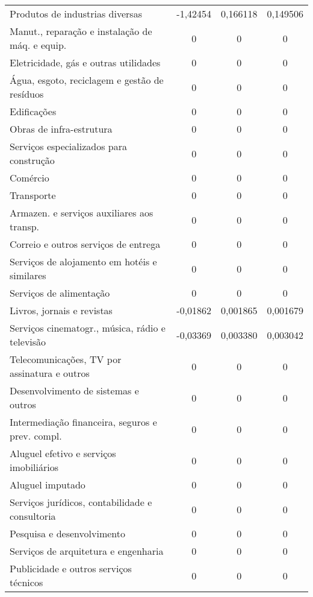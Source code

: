 \begin{apendicesenv}
\begin{small}
\begin{center}
\begin{longtable}{m{8cm}ccc}
				Produtos de industrias diversas                    & -1,42454 & 0,166118 & 0,149506 \\
				Manut., reparação e instalação de máq. e equip.    & 0 & 0 & 0 \\
				Eletricidade, gás e outras   utilidades            & 0 & 0 & 0 \\
				Água, esgoto, reciclagem e   gestão de resíduos    & 0 & 0 & 0 \\
				Edificações                                        & 0 & 0 & 0 \\
				Obras de infra-estrutura                           & 0 & 0 & 0 \\
				Serviços especializados para construção            & 0 & 0 & 0 \\
				Comércio                                           & 0 & 0 & 0 \\
				Transporte                                         & 0 & 0 & 0 \\
				Armazen. e serviços auxiliares aos transp.         & 0 & 0 & 0 \\
				Correio e outros serviços de entrega               & 0 & 0 & 0 \\
				Serviços de alojamento em hotéis e similares       & 0 & 0 & 0 \\
				Serviços de alimentação                            & 0 & 0 & 0 \\
				Livros, jornais e revistas                         & -0,01862 & 0,001865 & 0,001679 \\
				Serviços cinematogr., música, rádio e televisão    & -0,03369 & 0,003380 & 0,003042 \\
				Telecomunicações, TV por assinatura e outros       & 0 & 0 & 0 \\
				Desenvolvimento de sistemas e outros               & 0 & 0 & 0 \\
				Intermediação financeira, seguros e prev. compl.   & 0 & 0 & 0 \\
				Aluguel efetivo e serviços imobiliários            & 0 & 0 & 0 \\
				Aluguel imputado                                   & 0 & 0 & 0 \\
				Serviços jurídicos, contabilidade e consultoria    & 0 & 0 & 0 \\
				Pesquisa e desenvolvimento                         & 0 & 0 & 0 \\
				Serviços de arquitetura e engenharia               & 0 & 0 & 0 \\
				Publicidade e outros serviços técnicos             & 0 & 0 & 0 \\

\end{longtable}
\end{center}
\end{small}
\end{apendicesenv}
